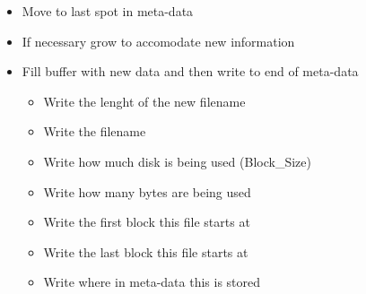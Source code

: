 \documentclass{article}
\begin{document}
\begin{itemize}
    \item    Move to last spot in meta-data
    \item    If necessary grow to accomodate new information
    \item    Fill buffer with new data and then write to end of meta-data
        \begin{itemize}
                \item   Write the lenght of the new filename
                \item   Write the filename
                \item   Write how much disk is being used (Block\_Size)
                \item   Write how many bytes are being used
                \item   Write the first block this file starts at
                \item   Write the last block this file starts at
                \item   Write where in meta-data this is stored
        \end{itemize}
\end{itemize}
\end{document}
